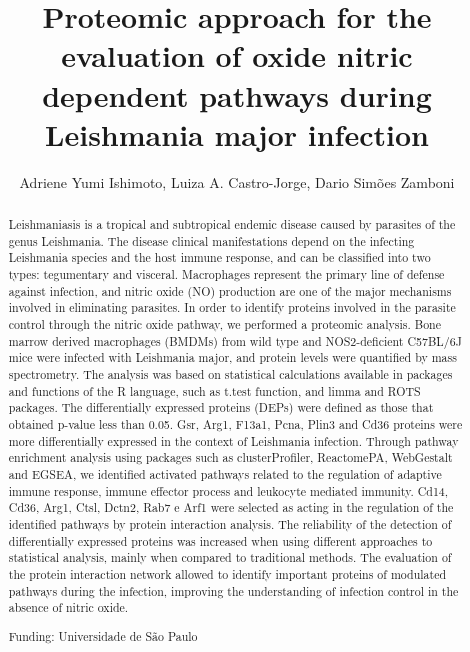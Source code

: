\documentclass[twoside]{article}
\title{\vspace{-15mm}\fontsize{24pt}{10pt}\selectfont\textbf{ Proteomic approach for the evaluation of oxide nitric dependent pathways during Leishmania major infection }} %
\author{ Adriene Yumi Ishimoto, Luiza A. Castro-Jorge, Dario Sim\~oes Zamboni }
\affil{ Universidade de S\~ao Paulo }
\date{}
\begin{document}
  
  
  \maketitle %
  
  
  \thispagestyle{fancy} %
  
  
  \begin{abstract}
  Leishmaniasis is a tropical and subtropical endemic disease caused by parasites of the genus Leishmania. The disease clinical manifestations depend on the infecting Leishmania species and the host immune response,  and can be classified into two types: tegumentary and visceral. Macrophages represent the primary line of defense against infection,  and nitric oxide (NO) production are one of the major mechanisms involved in eliminating parasites. In order to identify proteins involved in the parasite control through the nitric oxide pathway,  we performed a proteomic analysis. Bone marrow derived macrophages (BMDMs) from wild type and NOS2-deficient C57BL/6J mice were infected with Leishmania major,  and protein levels were quantified by mass spectrometry. The analysis was based on statistical calculations available in packages and functions of the R language,  such as t.test function,  and limma and ROTS packages. The differentially expressed proteins (DEPs) were defined as those that obtained p-value less than 0.05. Gsr,  Arg1,  F13a1,  Pcna,  Plin3 and Cd36 proteins were more differentially expressed in the context of Leishmania infection. Through pathway enrichment analysis using packages such as clusterProfiler,  ReactomePA,  WebGestalt and EGSEA,  we identified activated pathways related to the regulation of adaptive immune response,  immune effector process and leukocyte mediated immunity. Cd14,  Cd36,  Arg1,  Ctsl,  Dctn2,  Rab7 e Arf1 were selected as acting in the regulation of the identified pathways by protein interaction analysis. The reliability of the detection of differentially expressed proteins was increased when using different approaches to statistical analysis,  mainly when compared to traditional methods. The evaluation of the protein interaction network allowed to identify important proteins of modulated pathways during the infection,  improving the understanding of infection control in the absence of nitric oxide.
  
  Funding: Universidade de S\~ao Paulo \\ 
  \end{abstract}
  
\end{document}
